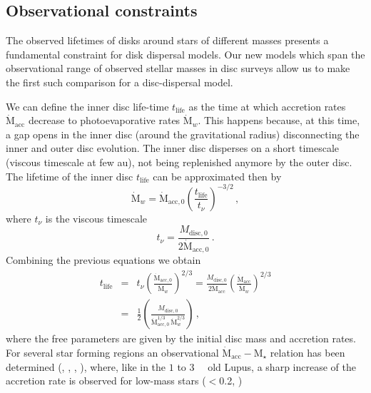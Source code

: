 \documentclass[usenatbib,useAMS,usedcolumn]{mnras}
\begin{document}
\subsection{Observational constraints}
The observed lifetimes of disks around stars of different masses presents a fundamental constraint for disk dispersal models. Our new models which span the observational range of observed stellar masses in disc surveys allow us to make the first such comparison for a disc-dispersal model.

We can define the inner disc life-time $t_\mathrm{life}$ as the time at which accretion rates $\dot{\mathrm{M}}_\mathrm{acc}$ decrease to photoevaporative rates $\dot{\mathrm{M}}_w$.
This happens because, at this time, a gap opens in the inner disc (around the gravitational radius) disconnecting the inner and outer disc evolution. 
The inner disc disperses on a short timescale (viscous timescale at few \si{\astronomicalunit}), not being replenished anymore by the outer disc.
The lifetime of the inner disc $t_\mathrm{life}$ can be approximated then by
\begin{equation}\label{eq:tlifedef}
    \dot{\mathrm{M}}_w = \dot{\mathrm{M}}_\mathrm{acc,0}\left(\frac{t_\mathrm{life}}{t_\nu}\right)^{-3/2}\, ,
\end{equation}
where $t_\nu$ is the viscous timescale
\begin{equation}
    t_\nu = \frac{M_\mathrm{disc,0}}{2 \dot{\mathrm{M}}_\mathrm{acc,0}}\, .
\end{equation}
Combining the previous equations we obtain
\begin{eqnarray}\label{eq:tlife}
    t_\mathrm{life} &=& t_\nu \left(\frac{\dot{\mathrm{M}}_\mathrm{acc,0}}{\dot{\mathrm{M}}_w}\right)^{2/3} = \frac{M_\mathrm{disc,0}}{2 \dot{\mathrm{M}}_\mathrm{acc}}\left(\frac{\dot{\mathrm{M}}_\mathrm{acc}}{\dot{\mathrm{M}}_w}\right)^{2/3} \nonumber \\
    &=& \frac{1}{2}\left(\frac{M_\mathrm{disc,0}}{\dot{\mathrm{M}}_\mathrm{acc,0}^{1/3}\,\dot{\mathrm{M}}_w^{2/3}}\right)\, ,
\end{eqnarray}
where the free parameters are given by the initial disc mass and accretion rates.
For several star forming regions an observational $\dot{\mathrm{M}}_\mathrm{acc}-\mathrm{M}_\star$ relation has been determined (, , , ), where, like in the $1$ to \SI{3}{\mega\year} old Lupus, a sharp increase of the accretion rate is observed for low-mass stars ($<$\SI{0.2}{\solarmass}, )
\end{document}
